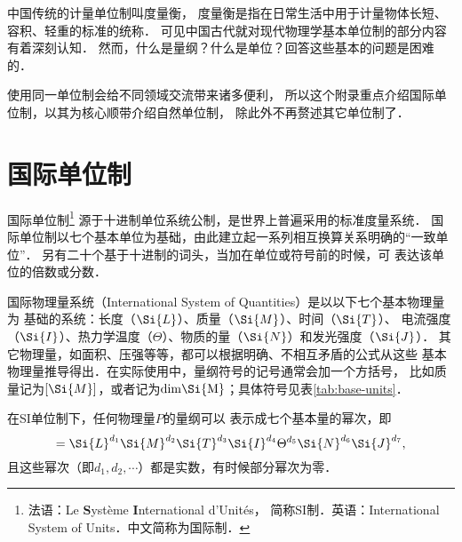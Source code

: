 中国传统的计量单位制叫度量衡，
度量衡是指在日常生活中用于计量物体长短、容积、轻重的标准的统称．
可见中国古代就对现代物理学基本单位制的部分内容有着深刻认知．
然而，什么是量纲？什么是单位？回答这些基本的问题是困难的．

使用同一单位制会给不同领域交流带来诸多便利，
所以这个附录重点介绍国际单位制，以其为核心顺带介绍自然单位制，
除此外不再赘述其它单位制了．

\section{国际单位制}
国际单位制{\footnote{法语：Le {\bf S}ystème {\bf I}nternational d'Unités，
        简称SI制．英语：International System of Units．中文简称为国际制．}}
源于十进制单位系统{\kaishu 公制}，是世界上普遍采用的标准度量系统． 
国际单位制以七个基本单位为基础，由此建立起一系列相互换算关系明确的“一致单位”．
另有二十个基于十进制的词头，当加在单位或符号前的时候，可
表达该单位的倍数或分数．


国际物理量系统（International System of Quantities）是以以下七个基本物理量为
基础的系统：长度（$\Si{L}$）、质量（$\Si{M}$）、时间（$\Si{T}$）、
电流强度（$\Si{I}$）、热力学温度（$\Theta$）、物质的量（$\Si{N}$）和发光强度（$\Si{J}$）．
其它物理量，如面积、压强等等，都可以根据明确、不相互矛盾的公式从这些
基本物理量推导得出．在实际使用中，量纲符号的记号通常会加一个方括号，
比如质量记为$[\Si{M}]$，或者记为$\rm{dim} \Si{M}$；具体符号见表\ref{tab:base-units}．


在SI单位制下，任何物理量$P$的量纲可以
表示成七个基本量的幂次，即
\begin{equation} %
    [P]=\Si{L}^{d_1} \Si{M}^{d_2} \Si{T}^{d_3} \Si{I}^{d_4} \Theta^{d_5} \Si{N}^{d_6} \Si{J}^{d_7} ,
\end{equation}
且这些幂次（即$d_1,d_2,\cdots$）都是实数，有时候部分幂次为零．
